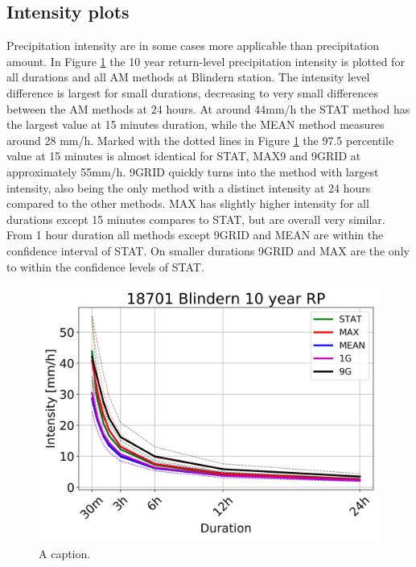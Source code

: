 \subsection{Intensity plots}

Precipitation intensity are in some cases more applicable than precipitation amount. In Figure \ref{fig:intensity_blindern_10} the 10 year return-level precipitation intensity is plotted for all durations and all AM methods at Blindern station. The intensity level difference is largest for small durations, decreasing to very small differences between the AM methods at 24 hours. At around 44mm/h the STAT method has the largest value at 15 minutes duration, while the MEAN method measures around 28  mm/h. Marked with the dotted lines in Figure \ref{fig:intensity_blindern_10} the 97.5 percentile value at 15 minutes is almost identical for STAT, MAX9 and 9GRID at approximately 55mm/h. 9GRID quickly turns into the method with largest intensity, also being the only method with a distinct intensity at 24 hours compared to the other methods. MAX has slightly higher intensity for all durations except 15 minutes compares to STAT, but are overall very similar. From 1 hour duration all methods except 9GRID and MEAN are within the confidence interval of STAT. On smaller durations 9GRID and MAX are the only to within the confidence levels of STAT.  

\begin{figure}[hbt!]
    \centering
    \includegraphics[scale=0.3]{figures/ECE_1985_real_idf_blindern.png}
    \caption{A caption.}
    \label{fig:intensity_blindern_10}
\end{figure}

